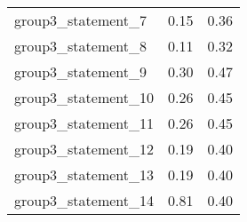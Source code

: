 \documentclass{article}
\begin{document}
\begin{table}[!h]
\begin{tabular}{lll}
\cline{1-3}
\multicolumn{1}{|l}{group3\_statement\_7} &
  \multicolumn{1}{|l}{0.15} &
  \multicolumn{1}{|l|}{0.36} \\
\cline{1-3}
\multicolumn{1}{|l}{group3\_statement\_8} &
  \multicolumn{1}{|l}{0.11} &
  \multicolumn{1}{|l|}{0.32} \\
\cline{1-3}
\multicolumn{1}{|l}{group3\_statement\_9} &
  \multicolumn{1}{|l}{0.30} &
  \multicolumn{1}{|l|}{0.47} \\
\cline{1-3}
\multicolumn{1}{|l}{group3\_statement\_10} &
  \multicolumn{1}{|l}{0.26} &
  \multicolumn{1}{|l|}{0.45} \\
\cline{1-3}
\multicolumn{1}{|l}{group3\_statement\_11} &
  \multicolumn{1}{|l}{0.26} &
  \multicolumn{1}{|l|}{0.45} \\
\cline{1-3}
\multicolumn{1}{|l}{group3\_statement\_12} &
  \multicolumn{1}{|l}{0.19} &
  \multicolumn{1}{|l|}{0.40} \\
\cline{1-3}
\multicolumn{1}{|l}{group3\_statement\_13} &
  \multicolumn{1}{|l}{0.19} &
  \multicolumn{1}{|l|}{0.40} \\
\cline{1-3}
\multicolumn{1}{|l}{group3\_statement\_14} &
  \multicolumn{1}{|l}{0.81} &
  \multicolumn{1}{|l|}{0.40} \\
\cline{1-3}
\end{tabular}
\end{table}
\end{document}
